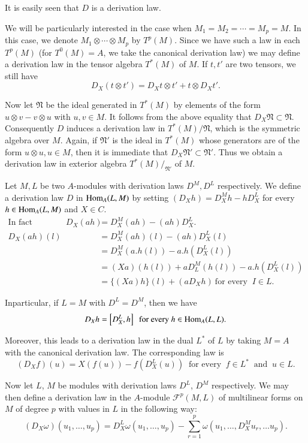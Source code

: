 It is easily seen that $D$ is a derivation law.

We will be particularly interested  in the case when $M_1 = M_2 = \cdots
= M_p = M$. In this case, we denote $M_1 \otimes \cdots \otimes M_p$
by $T^p(M)$. Since we have such a law in each $T^p(M)$ (for $T^0
(M)=A$, we take the canonical derivation law) we may define a
derivation law in the  tensor algebra $T^*(M)$ of $M$. If $t,t'$ are
two tensors, we still have  
$$
D_X(t \otimes t') = D_X t \otimes t'  +  t \otimes D_X t'. 
$$

Now let $\mathfrak{N}$  be the ideal generated in $T^* (M)$ by
elements of the form $u \otimes v-  v \otimes u$ with $u, v \in M$. It
follows from the above equality that $D_X \mathfrak{N} \subset
\mathfrak{N}$. Consequently  $D$ induces a derivation law in $T^*(M) /
\mathfrak{N}$, which is the symmetric algebra over $M$. Again, if
$\mathfrak{N}'$ is  the ideal in $T^*(M)$ whose generators are of the
form $u \otimes u, u \in M$, then it is immediate that $D_X
\mathfrak{N}' \subset \mathfrak{N}'$. Thus we obtain a derivation law
in exterior algebra $T^*(M) / _\mathfrak{N'}$ of $M$. 

Let $M,L$ be two $A$-modules with derivation laws  $D^M, D^L$
respectively. We define a derivation  law $D$ in $\operatorname{Hom}_A(L,M)$ by
setting 
$(D_X h) = D^M_X h - h D^L_X$  for every  $h \in \operatorname{Hom}_{A}(L,M)$
and $X \in C$.
\begin{align*}
  \text{In fact} \qquad \qquad D_X (ah) &= D^M_X(ah) - (ah)D^L_X. \\
  D_X(ah)(l) &= D^M_X(ah)(l) - (ah)D^L_X(l) \\
  &=  D^M_X(a.h(l))-a. h (D^L_X(l))\\
  &=(Xa) (h(l)) +a  D^M_L(h(l)) - a.h (D^L_X(l)) \\
  &= \{ (Xa)h \} (l) + (aD_Xh) ~ \text{for every } ~ I \in L.
\end{align*}

In\pageoriginale particular, if $L= M$ with $D^L= D^M$, then we have 
$$
D_Xh =  \left[ D^L_X, h \right] ~ \text{ for every} ~ h \in \operatorname{Hom}_A (L,L). 
$$

Moreover, this leads to a derivation  law in the dual $L^*$ of $L$ by
taking $M =A$ with the canonical derivation law. The corresponding law
is  
$$
(D_Xf) (u) = X(f(u))  - f(D_X^L(u)) ~ \text{ for every } ~ f \in L^* ~
\text{ and } ~ u \in L. 
$$

Now let $L$, $M$ be modules with derivation  laws $D^L$, $D^M$
respectively. We may then define a derivation law in the $A$-module
$\mathscr{F}^p (M,L)$ of multilinear forms on $M$ of degree $p$ with
values in $L$ in the following way:  
$$
(D_X \omega )(u_1, \ldots , u_p) = D^L_X \omega (u_1, \ldots , u_p)-
\sum_{r=1}^p \omega (u_1,  \ldots , D^M_X u_r , \ldots u_p).  
$$

